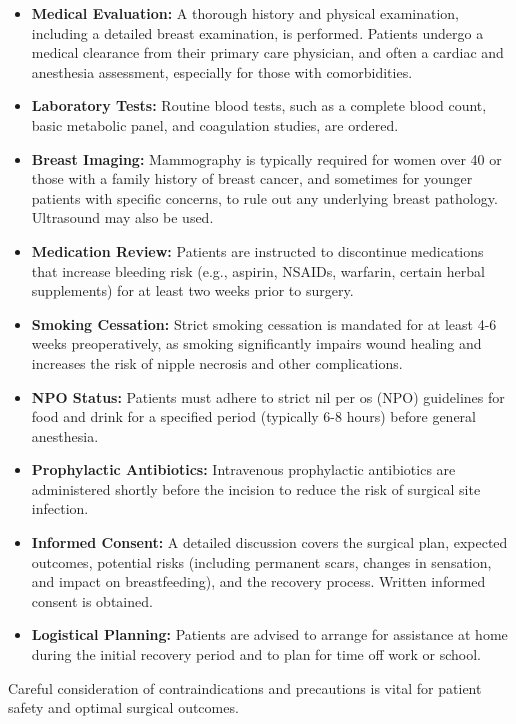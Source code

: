 \begin{itemize}
  \item \textbf{Medical Evaluation:} A thorough history and physical examination, including a detailed breast examination, is performed. Patients undergo a medical clearance from their primary care physician, and often a cardiac and anesthesia assessment, especially for those with comorbidities.
  \item \textbf{Laboratory Tests:} Routine blood tests, such as a complete blood count, basic metabolic panel, and coagulation studies, are ordered.
  \item \textbf{Breast Imaging:} Mammography is typically required for women over 40 or those with a family history of breast cancer, and sometimes for younger patients with specific concerns, to rule out any underlying breast pathology. Ultrasound may also be used.
  \item \textbf{Medication Review:} Patients are instructed to discontinue medications that increase bleeding risk (e.g., aspirin, NSAIDs, warfarin, certain herbal supplements) for at least two weeks prior to surgery.
  \item \textbf{Smoking Cessation:} Strict smoking cessation is mandated for at least 4-6 weeks preoperatively, as smoking significantly impairs wound healing and increases the risk of nipple necrosis and other complications.
  \item \textbf{NPO Status:} Patients must adhere to strict nil per os (NPO) guidelines for food and drink for a specified period (typically 6-8 hours) before general anesthesia.
  \item \textbf{Prophylactic Antibiotics:} Intravenous prophylactic antibiotics are administered shortly before the incision to reduce the risk of surgical site infection.
  \item \textbf{Informed Consent:} A detailed discussion covers the surgical plan, expected outcomes, potential risks (including permanent scars, changes in sensation, and impact on breastfeeding), and the recovery process. Written informed consent is obtained.
  \item \textbf{Logistical Planning:} Patients are advised to arrange for assistance at home during the initial recovery period and to plan for time off work or school.
\end{itemize}

Careful consideration of contraindications and precautions is vital for patient safety and optimal surgical outcomes.

